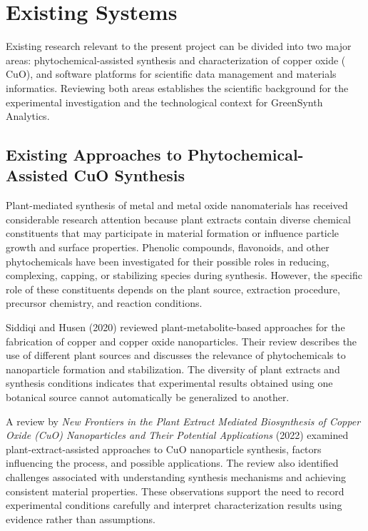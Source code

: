 \documentclass[12pt,a4paper,oneside]{report}
\begin{document}
{{{\section{Existing Systems}

Existing research relevant to the present project can be divided into two major areas: phytochemical-assisted synthesis and characterization of copper oxide ($\text{CuO}$), and software platforms for scientific data management and materials informatics. Reviewing both areas establishes the scientific background for the experimental investigation and the technological context for GreenSynth Analytics.

\subsection{Existing Approaches to Phytochemical-Assisted CuO Synthesis}

Plant-mediated synthesis of metal and metal oxide nanomaterials has received considerable research attention because plant extracts contain diverse chemical constituents that may participate in material formation or influence particle growth and surface properties. Phenolic compounds, flavonoids, and other phytochemicals have been investigated for their possible roles in reducing, complexing, capping, or stabilizing species during synthesis. However, the specific role of these constituents depends on the plant source, extraction procedure, precursor chemistry, and reaction conditions.

Siddiqi and Husen (2020) reviewed plant-metabolite-based approaches for the fabrication of copper and copper oxide nanoparticles. Their review describes the use of different plant sources and discusses the relevance of phytochemicals to nanoparticle formation and stabilization. The diversity of plant extracts and synthesis conditions indicates that experimental results obtained using one botanical source cannot automatically be generalized to another.

A review by \textit{New Frontiers in the Plant Extract Mediated Biosynthesis of Copper Oxide (CuO) Nanoparticles and Their Potential Applications} (2022) examined plant-extract-assisted approaches to $\text{CuO}$ nanoparticle synthesis, factors influencing the process, and possible applications. The review also identified challenges associated with understanding synthesis mechanisms and achieving consistent material properties. These observations support the need to record experimental conditions carefully and interpret characterization results using evidence rather than assumptions.

}}}
\end{document}
